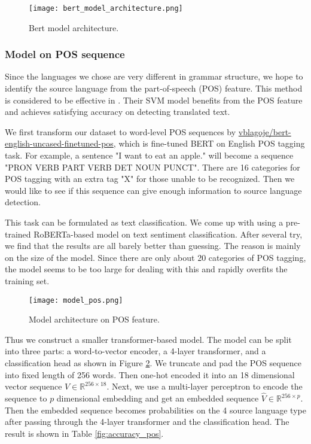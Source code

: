 \documentclass[twocolumn]{article}
\begin{document}
\begin{figure}
    \centering
    \texttt{[image: bert\_model\_architecture.png]}
    \caption{Bert model architecture.}
    \label{fig:bert_model_architecture}
\end{figure}



\subsubsection*{Model on POS sequence}
Since the languages we chose are very different in grammar structure, we hope to identify the source language from the part-of-speech (POS) feature. This method is considered to be effective in \cite{canada}. Their SVM model benefits from the POS feature and achieves satisfying accuracy on detecting translated text.

We first transform our dataset to word-level POS sequences by \href{https://huggingface.co/vblagoje/bert-english-uncased-finetuned-pos}{vblagoje/bert-english-uncased-finetuned-pos}, which is fine-tuned BERT on English POS tagging task. For example, a sentence "I want to eat an apple." will become a sequence "PRON VERB PART VERB DET NOUN PUNCT". There are 16 categories for POS tagging with an extra tag "X" for those unable to be recognized. Then we would like to see if this sequence can give enough information to source language detection.

This task can be formulated as text classification. We come up with using a pre-trained RoBERTa-based model on text sentiment classification. After several try, we find that the results are all barely better than guessing. The reason is mainly on the size of the model. Since there are only about 20 categories of POS tagging, the model seems to be too large for dealing with this and rapidly overfits the training set.

\begin{figure}
    \centering
    \texttt{[image: model\_pos.png]}
    \caption{Model architecture on POS feature.}
    \label{fig:model_pos}
\end{figure}

Thus we construct a smaller transformer-based model. The model can be split into three parts: a word-to-vector encoder, a 4-layer transformer, and a classification head as shown in Figure \ref{fig:model_pos}. We truncate and pad the POS sequence into fixed length of 256 words. Then one-hot encoded it into an 18 dimensional vector sequence $V \in \mathbb{R}^{256 \times 18}$. Next, we use a multi-layer perceptron to encode the sequence to $p$ dimensional embedding and get an embedded sequence $\hat{V} \in \mathbb{R}^{256 \times p}$. Then the embedded sequence becomes probabilities on the 4 source language type after passing through the 4-layer transformer and the classification head. The result is shown in Table \ref{fig:accuracy_pos}.
\end{document}
